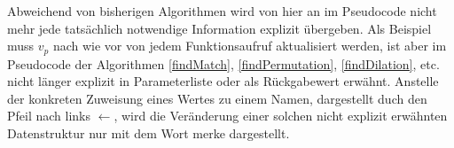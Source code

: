 \begin{algorithm}
\DontPrintSemicolon
\caption{$\Const{findMatch} \colon M \times T \rightarrow \mathit{Bool}$}\label{findMatch}

 {
}
\end{algorithm}

\begin{algorithm}
\DontPrintSemicolon
\caption{$\Const{rematch} \colon M \times T \rightarrow \mathit{Bool}$}\label{rematch}
 {
	 {
	}
	 {
	}
	 {
	}
}        
\end{algorithm}

Abweichend von bisherigen Algorithmen wird von hier an im Pseudocode nicht mehr jede tatsächlich notwendige Information explizit übergeben. Als Beispiel muss $v_p$ nach wie vor von jedem Funktionsaufruf aktualisiert werden, ist aber im Pseudocode der Algorithmen \ref{findMatch}, \ref{findPermutation}, \ref{findDilation}, etc. nicht länger explizit in Parameterliste oder als Rückgabewert erwähnt.
Anstelle der konkreten Zuweisung eines Wertes zu einem Namen, dargestellt duch den Pfeil nach links \glqq $\leftarrow$\grqq{}, wird die Veränderung einer solchen nicht explizit erwähnten Datenstruktur nur mit dem Wort \glqq merke\grqq{} dargestellt.

